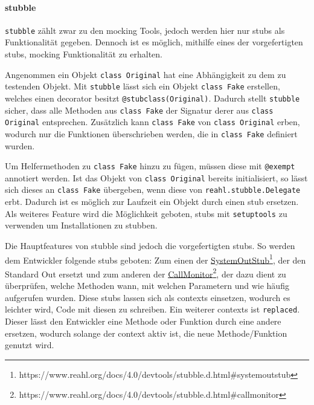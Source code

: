 \paragraph{stubble}\label{python-tools:stubble}\mbox{}
\newline
\lstinline{stubble} zählt zwar zu den \gls{mock}ing Tools, jedoch werden hier
nur \Glspl{stub} als Funktionalität gegeben. Dennoch ist es möglich, mithilfe 
eines der vorgefertigten \Glspl{stub}, \gls{mock}ing Funktionalität zu erhalten.
\newline

Angenommen ein Objekt \lstinline{class Original} hat eine Abhängigkeit zu dem zu
testenden Objekt. Mit \lstinline{stubble} lässt sich ein Objekt
\lstinline{class Fake} erstellen, welches einen \gls{decorator} besitzt
\lstinline{@stubclass(Original)}. Dadurch stellt \lstinline{stubble} sicher,
dass alle Methoden aus \lstinline{class Fake} der Signatur derer aus
\lstinline{class Original} entsprechen. Zusätzlich kann \lstinline{class Fake}
von \lstinline{class Original} erben, wodurch nur die Funktionen überschrieben
werden, die in \lstinline{class Fake} definiert wurden.

Um Helfermethoden zu \lstinline{class Fake} hinzu zu fügen, müssen diese mit
\lstinline{@exempt} annotiert werden. Ist das Objekt von
\lstinline{class Original} bereits initialisiert, so lässt sich dieses an
\lstinline{class Fake} übergeben, wenn diese von 
\lstinline{reahl.stubble.Delegate} erbt. Dadurch ist es möglich zur Laufzeit
ein Objekt durch einen \Gls{stub} ersetzen. Als weiteres Feature wird die
Möglichkeit geboten, \Glspl{stub} mit \lstinline{setuptools} zu verwenden um
Installationen zu \gls{stub}ben.

Die Hauptfeatures von stubble sind jedoch die vorgefertigten \Glspl{stub}. So
werden dem Entwickler folgende \Glspl{stub} geboten:
Zum einen der
\href{https://www.reahl.org/docs/4.0/devtools/stubble.d.html\#systemoutstub}{SystemOutStub}\footnote{https://www.reahl.org/docs/4.0/devtools/stubble.d.html\#systemoutstub},
der den Standard Out ersetzt und zum anderen der
\href{https://www.reahl.org/docs/4.0/devtools/stubble.d.html\#callmonitor}{CallMonitor}\footnote{https://www.reahl.org/docs/4.0/devtools/stubble.d.html\#callmonitor},
der dazu dient zu überprüfen, welche Methoden wann, mit welchen Parametern und
wie häufig aufgerufen wurden.
Diese \Glspl{stub} lassen sich als \Glspl{context} einsetzen, wodurch es
leichter wird, Code mit diesen zu schreiben. Ein weiterer \Glspl{context} ist
\lstinline{replaced}. Dieser lässt den Entwickler eine Methode oder Funktion
durch eine andere ersetzen, wodurch solange der \Gls{context} aktiv ist, die
neue Methode/Funktion genutzt wird.

